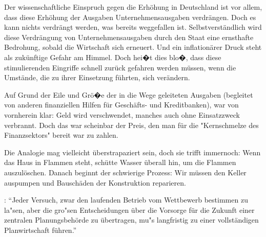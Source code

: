 \documentclass[
    onecolumn,
    a4paper,
    abstracton,
    parskip=half
    ,final
    ]{scrartcl}
\begin{document}
Der wissenschaftliche Einspruch gegen die Erh{\"o}hung in Deutschland ist vor allem, dass diese Erh{\"o}hung der Ausgaben Unternehmensausgaben verdr{\"a}ngen. Doch es kann nichts verdr{\"a}ngt werden, was bereits weggefallen ist. Selbstverst{\"a}ndlich wird diese Verdr{\"a}ngung von Unternehmensausgaben durch den Staat eine ernsthafte Bedrohung, sobald die Wirtschaft sich erneuert. Und ein inflation{\"a}rer Druck steht als zuk{\"u}nftige Gefahr am Himmel. Doch hei�t dies blo�, dass diese stimulierenden Eingriffe schnell zur{\"u}ck gefahren werden m{\"u}ssen, wenn die Umst{\"a}nde, die zu ihrer Einsetzung f{\"u}hrten, sich ver{\"a}ndern.

Auf Grund der Eile und Gr{\"o}�e der in die Wege geleiteten Ausgaben (begleitet von anderen finanziellen Hilfen f{\"u}r Gesch{\"a}fts- und Kreditbanken), war von vornherein klar: Geld wird verschwendet, manches auch ohne Einsatzzweck verbrannt. Doch das war scheinbar der Preis, den man f{\"u}r die "Kernschmelze des Finanzsektors" bereit war zu zahlen.

Die Analogie mag vielleicht {\"u}berstrapaziert sein, doch sie trifft immernoch: Wenn das Haus in Flammen steht, sch{\"u}tte Wasser {\"u}berall hin, um die Flammen auszul{\"o}schen. Danach beginnt der schwierige Prozess: Wir m{\"u}ssen den Keller auspumpen und Bausch{\"a}den der Konstruktion reparieren.




 \citep[vgl.][S.23f]{Hayek1969}: "`Jeder Versuch, zwar den laufenden Betrieb vom Wettbewerb bestimmen zu la{"s}en,
 aber die gro{"s}en Entscheidungen {\"u}ber die Vorsorge f{\"u}r die Zukunft einer zentralen Planungsbeh{\"o}rde zu {\"u}bertragen,
mu{"s} langfristig zu einer vollst{\"a}ndigen Planwirtschaft f{\"u}hren."'
\end{document}
